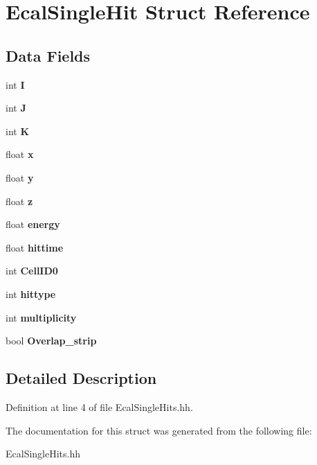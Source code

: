 \section{EcalSingleHit Struct Reference}
\label{structEcalSingleHit}
\subsection*{Data Fields}
\begin{DoxyCompactItemize}
\item 
int {\bfseries I}\label{structEcalSingleHit_ae578cbaa0ea7c69d07c7ee4a3494b0a4}

\item 
int {\bfseries J}\label{structEcalSingleHit_added1324c391c5f65b64ff5101d57815}

\item 
int {\bfseries K}\label{structEcalSingleHit_a2b41adbb1a1951082a576e2946f2c565}

\item 
float {\bfseries x}\label{structEcalSingleHit_acbe99a6c25dbafe6c183a502d27d06fe}

\item 
float {\bfseries y}\label{structEcalSingleHit_a21bc45b5f6b8cc1d304ff8690458054c}

\item 
float {\bfseries z}\label{structEcalSingleHit_a544ae1aa36f404766d44346ba6e17bd1}

\item 
float {\bfseries energy}\label{structEcalSingleHit_abea53cadbe2e6705c61d1b31663ed6b2}

\item 
float {\bfseries hittime}\label{structEcalSingleHit_a2496240ba297d34250884676064574a2}

\item 
int {\bfseries CellID0}\label{structEcalSingleHit_af397ceaef3933f6572e90350a61728dd}

\item 
int {\bfseries hittype}\label{structEcalSingleHit_aec28d77ea72749051db6ddd4927aac1b}

\item 
int {\bfseries multiplicity}\label{structEcalSingleHit_a2d5b2b52900d835faed187a86c728bbe}

\item 
bool {\bfseries Overlap\_\-strip}\label{structEcalSingleHit_a3c05251f3b4ef3f1969de0c37de78aef}

\end{DoxyCompactItemize}


\subsection{Detailed Description}


Definition at line 4 of file EcalSingleHits.hh.

The documentation for this struct was generated from the following file:\begin{DoxyCompactItemize}
\item 
EcalSingleHits.hh\end{DoxyCompactItemize}

